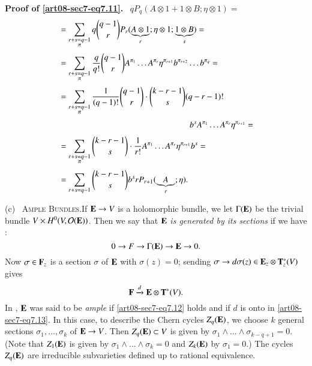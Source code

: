 \noindent
{\bf Proof of \eqref{art08-sec7-eq7.11}.}~ $qP_{q}(A\otimes 1+1\otimes B;\eta\otimes 1)=$
\begin{align*}
&= \sum\limits_{\substack{r+s=q-1\\ \pi}}q\binom{q-1}{r}P_{r}(\underbrace{A\otimes 1}_{r};\eta\otimes 1; \underbrace{1\otimes B}_{s})=\\[3pt]
&= \sum\limits_{\substack{r+s=q-1\\ \pi}}\dfrac{q}{q!}\binom{q-1}{r}A^{\pi_{1}}\ldots A^{\pi_{r}}\eta^{\pi_{r+1}}b^{\pi_{r+2}}\ldots b^{\pi_{q}}=\\[3pt]
&= \sum\limits_{\substack{r+s=q-1\\ \pi}}\dfrac{1}{(q-1)!}\binom{q-1}{r}\cdot \binom{k-r-1}{s}(q-r-1)!\\[3pt]
&\hspace{5.5cm} b^{s}A^{\pi_{1}}\ldots A^{\pi_{r}}\eta^{\pi_{r+1}}=\\[3pt]
&= \sum\limits_{\substack{r+s=q-1\\ \pi}}\binom{k-r-1}{s}\cdot \dfrac{1}{r!}A^{\pi_{1}}\ldots A^{\pi_{r}}\eta^{\pi_{r+1}}b^{s}=\\[3pt]
&= \sum\limits_{r+s=q-1}\binom{k-r-1}{s}b^{s}rP_{r+1}(\underbrace{A}_{r};\eta).
\end{align*}

(c)~ \textsc{Ample Bundles.}\pageoriginale If $\mathbf{E}\to V$ is a holomorphic bundle, we let $\Gamma(\mathbf{E})$ be the trivial bundle $V\times H^{0}(V,\mathcal{O}(\mathbf{E}))$. Then we say that $\mathbf{E}$ {\em is generated by its sections} if we have :
\begin{equation}
0\to F\to \Gamma(\mathbf{E})\to \mathbf{E}\to 0.\label{art08-sec7-eq7.12}
\end{equation}
Now $\sigma\in \mathbf{F}_{z}$ is a section $\sigma$ of $\mathbf{E}$ with $\sigma(z)=0$; sending $\sigma\to d\sigma(z)\in \mathbf{E}_{z}\otimes \mathbf{T}^{*}_{z}(V)$ gives
\begin{equation}
\mathbf{F}\xrightarrow{d}\mathbf{E}\otimes \mathbf{T}^{*}(V).\label{art08-sec7-eq7.13}
\end{equation}
In \cite{art08-key11}, $\mathbf{E}$ was said to be {\em ample} if \eqref{art08-sec7-eq7.12} holds and if $d$ is onto in \eqref{art08-sec7-eq7.13}. In this case, to describe the Chern cycles $Z_{q}(\mathbf{E})$, we choose $k$ general sections $\sigma_{1},\ldots,\sigma_{k}$ of $\mathbf{E}\to V$. Then $Z_{q}(\mathbf{E})\subset V$ is given by $\sigma_{1}\wedge\ldots\wedge \sigma_{k-q+1}=0$. (Note that $Z_{1}(\mathbf{E})$ is given by $\sigma_{1}\wedge\ldots\wedge \sigma_{k}=0$ and $Z_{k}(\mathbf{E})$ by $\sigma_{1}=0$.) The cycles $Z_{q}(\mathbf{E})$ are irreducible subvarieties defined up to rational equivalence.

